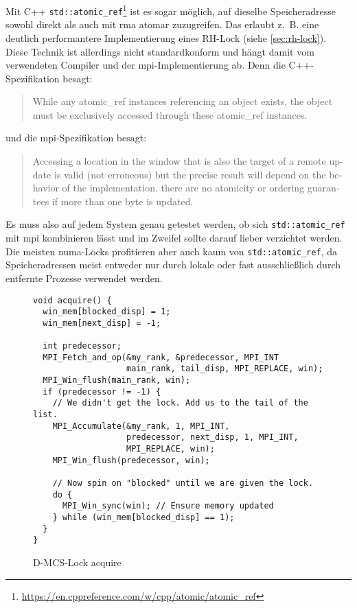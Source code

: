 Mit C++ \texttt{std::atomic\_ref}\footnote{\label{note:atomic_ref}\url{https://en.cppreference.com/w/cpp/atomic/atomic_ref}} ist es sogar möglich,
auf dieselbe Speicheradresse sowohl direkt
als auch mit \gls{rma} atomar zuzugreifen.
Das erlaubt z.~B. eine deutlich performantere Implementierung eines RH-Lock (siehe \autoref{sec:rh-lock}).
Diese Technik ist allerdings nicht standardkonform und hängt damit vom verwendeten Compiler und der \gls{mpi}-Implementierung ab.
Denn die C++-Spezifikation besagt:
\foreignblockquote{english}[]{%
    While any atomic\_ref instances referencing an object exists,
    the object must be exclusively accessed through these atomic\_ref instances.}
und die \gls{mpi}-Spezifikation besagt:
\foreignblockcquote{english}[Kapitel 11.7, S. 455]{MPI-3.1}{%
    Accessing a location in the window that is also the target of a remote update is valid
    (not erroneous) but the precise result will depend on the behavior of the implementation.
    \textelp{}
    there are no atomicity or ordering guarantees if more than one byte is updated.}
Es muss also auf jedem System genau getestet werden,
ob sich \texttt{std::atomic\_ref} mit \gls{mpi} kombinieren lässt
und im Zweifel sollte darauf lieber verzichtet werden.
Die meisten \gls{numa}-Locks profitieren aber auch kaum von \texttt{std::atomic\_ref},
da Speicheradressen meist entweder nur durch lokale
oder fast ausschließlich durch entfernte Prozesse verwendet werden.
































\begin{figure}
    \begin{lstlisting}
void acquire() {
  win_mem[blocked_disp] = 1;
  win_mem[next_disp] = -1;

  int predecessor;
  MPI_Fetch_and_op(&my_rank, &predecessor, MPI_INT
                   main_rank, tail_disp, MPI_REPLACE, win);
  MPI_Win_flush(main_rank, win);
  if (predecessor != -1) {
    // We didn't get the lock. Add us to the tail of the list.
    MPI_Accumulate(&my_rank, 1, MPI_INT,
                   predecessor, next_disp, 1, MPI_INT,
                   MPI_REPLACE, win);
    MPI_Win_flush(predecessor, win);

    // Now spin on "blocked" until we are given the lock.
    do {
      MPI_Win_sync(win); // Ensure memory updated
    } while (win_mem[blocked_disp] == 1);
  }
}
\end{lstlisting}
    \caption{D-MCS-Lock acquire}
    \label{fig:dmcs_acquire}
\end{figure}

